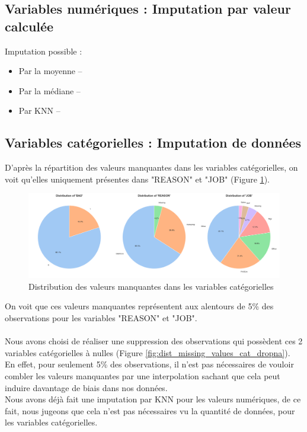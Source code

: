 \documentclass[a4paper,12pt]{report}
\begin{document}
\subsection{Variables numériques : Imputation par valeur calculée}

Imputation possible :
\begin{itemize}
  \item Par la moyenne --
  \item Par la médiane --
  \item Par KNN --
\end{itemize}

\subsection{Variables catégorielles : Imputation de données}

D'après la répartition des valeurs manquantes dans les variables catégorielles, on voit qu'elles 
uniquement présentes dans "REASON" et "JOB" (Figure \ref{fig:dist_missing_values_cat}).

\begin{figure}[h!]
  \includegraphics[width=\textwidth]{piechart_valeurs_manquantes_var_categorial}
  \caption{Distribution des valeurs manquantes dans les variables catégorielles}
  \label{fig:dist_missing_values_cat}
\end{figure}

On voit que ces valeurs manquantes représentent aux alentours de 5\% des observations pour les variables "REASON" et "JOB".\\
\\
Nous avons choisi de réaliser une suppression des observations qui possèdent ces 2 variables catégorielles à nulles (Figure \ref{fig:dist_missing_values_cat_dropna}).\\
En effet, pour seulement 5\% des observations, il n'est pas nécessaires de vouloir combler les valeurs manquantes par une interpolation
sachant que cela peut induire davantage de biais dans nos données.\\
Nous avons déjà fait une imputation par KNN pour les valeurs numériques, de ce fait, nous jugeons que cela n'est pas nécessaires vu la quantité de données,
pour les variables catégorielles.
\\
\end{document}
